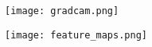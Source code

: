 \begin{frame}
  \begin{figure}
    \centering
    \texttt{[image: gradcam.png]}
  \end{figure}
\end{frame}

\begin{frame}
  \begin{figure}
    \centering
    \texttt{[image: feature\_maps.png]}
  \end{figure}
\end{frame}